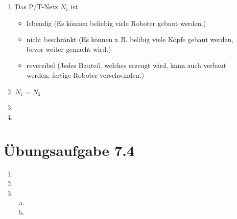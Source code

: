 \documentclass[a4paper]{scrartcl}
\begin{document}
\begin{enumerate}
    \item
        Das P/T-Netz $N_1$ ist
        \begin{itemize}
            \item lebendig (Es können beliebig viele Roboter gebaut werden.)
            \item nicht beschränkt (Es können z.\,B. belibig viele Köpfe gebaut
                werden, bevor weiter gemacht wird.)
            \item reversibel (Jedes Bauteil, welches erzeugt wird, kann auch
                verbaut werden; fertige Roboter verschwinden.)
        \end{itemize}

    \item
        $N_1 = N_2$

    \item

    \item

\end{enumerate}

\section*{Übungsaufgabe 7.4} 
\begin{enumerate}
    \item

    \item

    \item
        \begin{enumerate}[(a)]
            \item

            \item

        \end{enumerate}

\end{enumerate}
\end{document}
